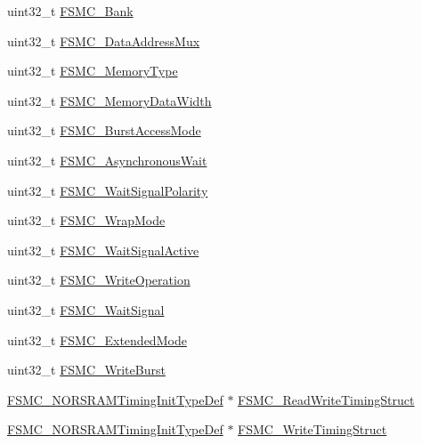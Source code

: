 \begin{DoxyCompactItemize}
\item 
uint32\+\_\+t \mbox{\hyperlink{struct_f_s_m_c___n_o_r_s_r_a_m_init_type_def_a787e4c845195c81c7326893451a2fc6f}{F\+S\+M\+C\+\_\+\+Bank}}
\item 
uint32\+\_\+t \mbox{\hyperlink{struct_f_s_m_c___n_o_r_s_r_a_m_init_type_def_a543a5c385820244e5f3b5a96b3b79f46}{F\+S\+M\+C\+\_\+\+Data\+Address\+Mux}}
\item 
uint32\+\_\+t \mbox{\hyperlink{struct_f_s_m_c___n_o_r_s_r_a_m_init_type_def_ab40afbbbeb92dd80001c6dfbb1f26492}{F\+S\+M\+C\+\_\+\+Memory\+Type}}
\item 
uint32\+\_\+t \mbox{\hyperlink{struct_f_s_m_c___n_o_r_s_r_a_m_init_type_def_aa89fb8c812e5ef7800eef9574dcb972d}{F\+S\+M\+C\+\_\+\+Memory\+Data\+Width}}
\item 
uint32\+\_\+t \mbox{\hyperlink{struct_f_s_m_c___n_o_r_s_r_a_m_init_type_def_a39ac3b708e861c1137a72ed0f7ede7ae}{F\+S\+M\+C\+\_\+\+Burst\+Access\+Mode}}
\item 
uint32\+\_\+t \mbox{\hyperlink{struct_f_s_m_c___n_o_r_s_r_a_m_init_type_def_a9178fc2849ddd6277a0dd2655c8b600c}{F\+S\+M\+C\+\_\+\+Asynchronous\+Wait}}
\item 
uint32\+\_\+t \mbox{\hyperlink{struct_f_s_m_c___n_o_r_s_r_a_m_init_type_def_a1b4af656a06371a567ccf494274c1261}{F\+S\+M\+C\+\_\+\+Wait\+Signal\+Polarity}}
\item 
uint32\+\_\+t \mbox{\hyperlink{struct_f_s_m_c___n_o_r_s_r_a_m_init_type_def_a62dd24d87fe026df5e35dc58a00988b4}{F\+S\+M\+C\+\_\+\+Wrap\+Mode}}
\item 
uint32\+\_\+t \mbox{\hyperlink{struct_f_s_m_c___n_o_r_s_r_a_m_init_type_def_aef0e381a5fbf637ad892903889a63583}{F\+S\+M\+C\+\_\+\+Wait\+Signal\+Active}}
\item 
uint32\+\_\+t \mbox{\hyperlink{struct_f_s_m_c___n_o_r_s_r_a_m_init_type_def_a3a876d65250ab693595b9b840ad63676}{F\+S\+M\+C\+\_\+\+Write\+Operation}}
\item 
uint32\+\_\+t \mbox{\hyperlink{struct_f_s_m_c___n_o_r_s_r_a_m_init_type_def_af7faa84a2f52410da02302eb2f48507a}{F\+S\+M\+C\+\_\+\+Wait\+Signal}}
\item 
uint32\+\_\+t \mbox{\hyperlink{struct_f_s_m_c___n_o_r_s_r_a_m_init_type_def_a3726a70e62c3e7d5172296e88d36cfe4}{F\+S\+M\+C\+\_\+\+Extended\+Mode}}
\item 
uint32\+\_\+t \mbox{\hyperlink{struct_f_s_m_c___n_o_r_s_r_a_m_init_type_def_a9f46fdb3f72340b6584d34501c19dbd4}{F\+S\+M\+C\+\_\+\+Write\+Burst}}
\item 
\mbox{\hyperlink{struct_f_s_m_c___n_o_r_s_r_a_m_timing_init_type_def}{F\+S\+M\+C\+\_\+\+N\+O\+R\+S\+R\+A\+M\+Timing\+Init\+Type\+Def}} $\ast$ \mbox{\hyperlink{struct_f_s_m_c___n_o_r_s_r_a_m_init_type_def_a9d18e112e4c644279e211c4a92dcd9a3}{F\+S\+M\+C\+\_\+\+Read\+Write\+Timing\+Struct}}
\item 
\mbox{\hyperlink{struct_f_s_m_c___n_o_r_s_r_a_m_timing_init_type_def}{F\+S\+M\+C\+\_\+\+N\+O\+R\+S\+R\+A\+M\+Timing\+Init\+Type\+Def}} $\ast$ \mbox{\hyperlink{struct_f_s_m_c___n_o_r_s_r_a_m_init_type_def_a1fbd19341b882de69c3026234eff037a}{F\+S\+M\+C\+\_\+\+Write\+Timing\+Struct}}
\end{DoxyCompactItemize}


